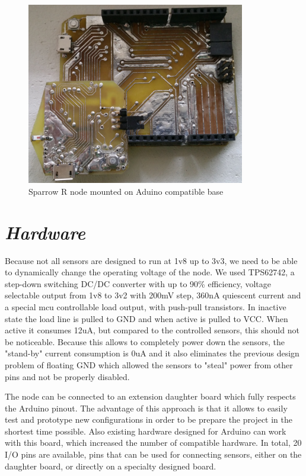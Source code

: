 \begin{figure}[ht] \centering
\includegraphics[width=0.85\textwidth]{img/base-with-sensor.jpg}
\caption{Sparrow R node mounted on Aduino compatible base}
\end{figure}

\section{\textit{Hardware}}
Because not all sensors are designed to run at 1v8 up to 3v3, we need to be able to dynamically
change the operating voltage of the node. We used TPS62742, a step-down switching DC/DC converter
with up to 90\% efficiency, voltage selectable output from 1v8 to 3v2 with 200mV step, 360nA
quiescent current and a special mcu controllable load output, with push-pull transistors. In
inactive state the load line is pulled to GND and when active is pulled to VCC. When active it
consumes 12uA, but compared to the controlled sensors, this should not be noticeable. Because this
allows to completely power down the sensors, the "stand-by" current consumption is 0uA and it also
eliminates the previous design problem of floating GND which allowed the sensors to "steal" power
from other pins and not be properly disabled.

The node can be connected to an extension daughter board which fully respects the Arduino pinout.
The advantage of this approach is that it allows to easily test and prototype new configurations in
order to be prepare the project in the shortest time possible. Also existing hardware designed for Arduino can work with this board,
which increased the number of compatible hardware. In total, 20 I/O pins are available, pins that
can be used for connecting sensors, either on the daughter board, or directly on a specialty
designed board.

